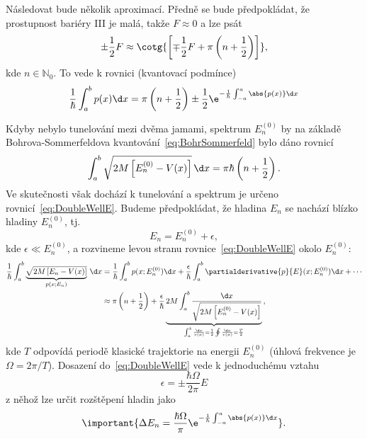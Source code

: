 \begin{solution}
\begin{enumerate}
		Následovat bude několik aproximací. 
		Předně se bude předpokládat, že prostupnost bariéry III je malá, takže $F\approx0$ a lze psát
		\begin{equation}
			\pm\frac{1}{2}F\approx\cotg{\left[\mp\frac{1}{2}F+\pi\left(n+\frac{1}{2}\right)\right]},
		\end{equation}
		kde $n\in\mathbb{N}_{0}$.
		To vede k rovnici (kvantovací podmínce)
		\begin{equation}
			\label{eq:DoubleWellE}
			\frac{1}{\hbar}\int_{a}^{b}p(x)\d x=\pi\left(n+\frac{1}{2}\right)\pm\frac{1}{2}\e^{-\frac{1}{\hbar}\int_{-a}^{a}\abs{p(x)}\d x}
		\end{equation}
	
		Kdyby nebylo tunelování mezi dvěma jamami, spektrum $E_{n}^{(0)}$ by na základě Bohrova-Sommerfeldova kvantování~\eqref{eq:BohrSommerfeld} bylo dáno rovnicí
		\begin{equation}
			\int_{a}^{b}\sqrt{2M\left[E_{n}^{(0)}-V(x)\right]}\,\d x=\pi\hbar\left(n+\frac{1}{2}\right).
		\end{equation}
		Ve skutečnosti však dochází k tunelování a spektrum je určeno rovnicí~\eqref{eq:DoubleWellE}.
		Budeme předpokládat, že hladina $E_{n}$ se nachází blízko hladiny $E_{n}^{(0)}$, tj.
		\begin{equation}
			E_{n}=E_{n}^{(0)}+\epsilon,
		\end{equation}
		kde $\epsilon\ll E_{n}^{(0)}$, a rozvineme levou stranu rovnice~\eqref{eq:DoubleWellE} okolo $E_{n}^{(0)}$:
		\begin{align}
			\frac{1}{\hbar}\int_{a}^{b}\underbrace{\sqrt{2M\left[E_{n}-V(x)\right]}}_{p(x;E_{n})}\,\d x
				&=\frac{1}{\hbar}\int_{a}^{b}p(x;E_{n}^{(0)})\d x+\frac{\epsilon}{\hbar}\int_{a}^{b}\partialderivative{p}{E}(x;E_{n}^{(0)})\d x+\dotsb\nonumber\\
				&\approx\pi\left(n+\frac{1}{2}\right)+\frac{\epsilon}{\hbar}\underbrace{2M\int_{a}^{b}\frac{\d x}{\sqrt{2M\left[E_{n}^{(0)}-V(x)\right]}}}_{\int_{a}^{b}\frac{\d x}{v(x)}=\frac{1}{2}\oint\frac{\d x}{v(x)}=\frac{T}{2}}\,,
		\end{align}
		kde $T$ odpovídá periodě klasické trajektorie na energii $E_{n}^{(0)}$ (úhlová frekvence je $\Omega=2\pi/T$).
		Dosazení do~\eqref{eq:DoubleWellE} vede k jednoduchému vztahu
		\begin{equation}
			\epsilon=\pm\frac{\hbar\Omega}{2\pi}E
		\end{equation}
		z něhož lze určit rozštěpení hladin jako
		\begin{equation}
			\label{eq:DoubleWellSplit}
			\important{\Delta E_{n}=\frac{\hbar\Omega}{\pi}\e^{-\frac{1}{\hbar}\int_{-a}^{a}\abs{p(x)}\d x}}.
		\end{equation}
	

\end{enumerate}
\end{solution}
